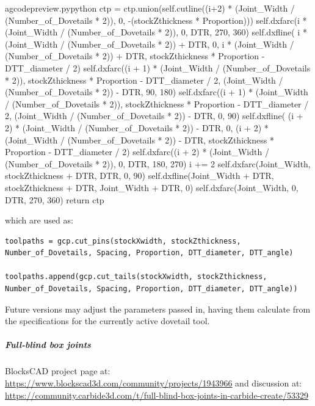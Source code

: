 \documentclass{ltxdoc}
\begin{document}
\begin{writecode}{a}{gcodepreview.py}{python}
            ctp = ctp.union(self.cutline((i+2) * (Joint_Width / (Number_of_Dovetails * 2)), 0, -(stockZthickness * Proportion)))
            self.dxfarc(i * (Joint_Width / (Number_of_Dovetails * 2)), 0, DTR, 270, 360)
            self.dxfline(
                i * (Joint_Width / (Number_of_Dovetails * 2)) + DTR, 
                0, 
                i * (Joint_Width / (Number_of_Dovetails * 2)) + DTR, stockZthickness * Proportion - DTT_diameter / 2)
            self.dxfarc((i + 1) * (Joint_Width / (Number_of_Dovetails * 2)), stockZthickness * Proportion - DTT_diameter / 2, (Joint_Width / (Number_of_Dovetails * 2)) - DTR, 90, 180)
            self.dxfarc((i + 1) * (Joint_Width / (Number_of_Dovetails * 2)), stockZthickness * Proportion - DTT_diameter / 2, (Joint_Width / (Number_of_Dovetails * 2)) - DTR, 0, 90)
            self.dxfline( 
                (i + 2) * (Joint_Width / (Number_of_Dovetails * 2)) - DTR, 
                0, 
                (i + 2) * (Joint_Width / (Number_of_Dovetails * 2)) - DTR, stockZthickness * Proportion - DTT_diameter / 2)
            self.dxfarc((i + 2) * (Joint_Width / (Number_of_Dovetails * 2)), 0, DTR, 180, 270)
            i += 2
        self.dxfarc(Joint_Width, stockZthickness + DTR, DTR, 0, 90)
        self.dxfline(Joint_Width + DTR, stockZthickness + DTR, Joint_Width + DTR, 0)
        self.dxfarc(Joint_Width, 0, DTR, 270, 360)
        return ctp

\end{writecode}
\addtocounter{gcpy}{63}

\noindent which are used as:

\begin{verbatim}
toolpaths = gcp.cut_pins(stockXwidth, stockZthickness, Number_of_Dovetails, Spacing, Proportion, DTT_diameter, DTT_angle)

toolpaths.append(gcp.cut_tails(stockXwidth, stockZthickness, Number_of_Dovetails, Spacing, Proportion, DTT_diameter, DTT_angle))
\end{verbatim}

Future versions may adjust the parameters passed in, having them calculate from the specifications for the currently active dovetail tool.

\subparagraph{Full-blind box joints}
 
\label{subsec:fullblindboxjoints}

BlocksCAD project page at: \url{https://www.blockscad3d.com/community/projects/1943966} and discussion at: \url{https://community.carbide3d.com/t/full-blind-box-joints-in-carbide-create/53329}
\end{document}
